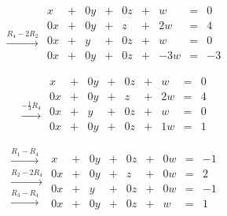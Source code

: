 \documentclass{ximera}
\begin{document}
\begin{exploration}
$$\begin{array}{c}
\\
\\
 \\
\xrightarrow{R_4-2R_2}\\
 \end{array}
\begin{matrix}
      x &+ &0y&+&0z&+&w&= &0 \\
	 0x& +&0y&+&z&+&2w&=&4\\
     0x& +&y&+&0z&+&w&=&0\\
     0x&+&0y&+& 0z&+& -3w&=& -3
    \end{matrix}$$


$$\begin{array}{c}
\\
 \\
 \\
\xrightarrow{-\frac{1}{3}R_4}\\
 \end{array}
\begin{matrix}
      x &+ &0y&+&0z&+&w&= &0 \\
	 0x& +&0y&+&z&+&2w&=&4\\
     0x& +&y&+&0z&+&w&=&0\\
     0x&+&0y&+&0z&+& 1w&=& 1
    \end{matrix}$$
    

$$
\begin{array}{c}
 \xrightarrow{R_1-R_4}\\
 \xrightarrow{R_2-2R_4}\\
\xrightarrow{R_3-R_4}\\
\\
 \end{array}
\begin{matrix}
      x &+ &0y&+&0z&+& 0w&= & -1 \\
	 0x& +&0y&+&z&+& 0w&=& 2\\
     0x& +&y&+&0z&+& 0w&=& -1\\
     0x&+&0y&+&0z&+&w&=&1
    \end{matrix}$$
    


\end{exploration}
\end{document}
